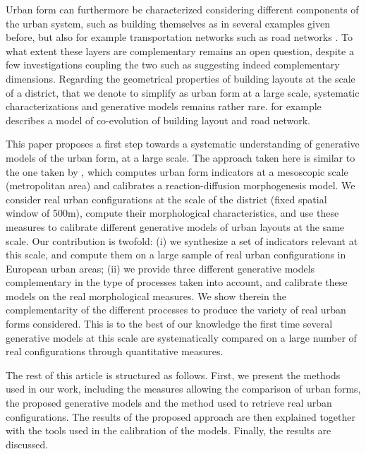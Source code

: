 \documentclass[letterpaper]{article}
\begin{document}
Urban form can furthermore be characterized considering different components of the urban system, such as building themselves as in several examples given before, but also for example transportation networks such as road networks \citep{ye2014quantitative}. To what extent these layers are complementary remains an open question, despite a few investigations coupling the two such as \cite{raimbault2018urban} suggesting indeed complementary dimensions. Regarding the geometrical properties of building layouts at the scale of a district, that we denote to simplify as urban form at a large scale, systematic characterizations and generative models remains rather rare. \cite{achibet2014model} for example describes a model of co-evolution of building layout and road network.



This paper proposes a first step towards a systematic understanding of generative models of the urban form, at a large scale.
The approach taken here is similar to the one taken by \cite{raimbault2018calibration}, which computes urban form indicators at a mesoscopic scale (metropolitan area) and calibrates a reaction-diffusion morphogenesis model.
We consider real urban configurations at the scale of the district (fixed spatial window of 500m), compute their morphological characteristics, and use these measures to calibrate different generative models of urban layouts at the same scale.
Our contribution is twofold: (i) we synthesize a set of indicators relevant at this scale, and compute them on a large sample of real urban configurations in European urban areas; (ii) we provide three different generative models complementary in the type of processes taken into account, and calibrate these models on the real morphological measures. We show therein the complementarity of the different processes to produce the variety of real urban forms considered.
This is to the best of our knowledge the first time several generative models at this scale are systematically compared on a large number of real configurations through quantitative measures.

The rest of this article is structured as follows.
First, we present the methods used in our work, including the measures allowing the comparison of urban forms, the proposed generative models and the method used to retrieve real urban configurations.
The results of the proposed approach are then explained together with the tools used in the calibration of the models.
Finally, the results are discussed.
\end{document}
